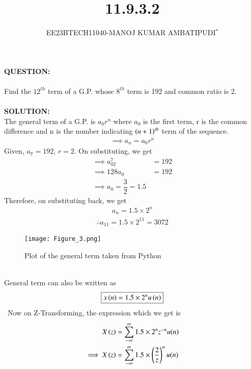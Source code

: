 \documentclass[journal,12pt,twocolumn]{IEEEtran}
\theoremstyle{remark}
\begin{document}

\vspace{3cm}
\title{\textbf{11.9.3.2}}
\author{EE23BTECH11040-MANOJ KUMAR AMBATIPUDI$^{*}$%
}
\maketitle
\newpage
\bigskip
\renewcommand{\thefigure}{\theenumi}
\renewcommand{\thetable}{\theenumi}
\textbf{QUESTION:}\\\\
Find the $12^{th}$ term of a G.P. whose $8^{th}$ term is 192 and common ratio is 2.\\\\
\textbf{SOLUTION:}\\
The general term of a G.P. is $a_0r^{n}$ where $a_0$ is the first term, r is the common difference and n is the number indicating $\left(n+1\right)^{th}$ term of the sequence.
\begin{align}
    \implies a_n=a_0r^{n}
\end{align}
Given, $a_7=192$, $r=2$. On substituting, we get
\begin{align}
\implies a_02^{7}&=192\\
\implies 128a_0&=192\\
\implies\boxed{a_0=\dfrac{3}{2}=1.5}
\end{align}
Therefore, on substituting back, we get
\begin{align}
    a_n=1.5\times2^{n}
\end{align}
\begin{align}
\therefore a_{11} = 1.5\times2^{11} = 3072
\end{align}
\begin{figure}[h]
\renewcommand\thefigure{1} 
    \centering
    \texttt{[image: Figure\_3.png]}
    \caption{Plot of the general term taken from Python}
    \label{fig:1}
\end{figure}\\
General term can also be written as\
\begin{align}
\boxed{x\left(n\right) = 1.5\times2^{n}u\left(n\right)}
\end{align}\
Now on Z-Transforming, the expression which we get is\\
\begin{align}
X\left(z\right) &= \sum_{-\infty}^{\infty}1.5\times2^{n}z^{-n}u(n)   \\
\implies X\left(z\right) &= \sum_{-\infty}^{\infty}1.5\times\left(\dfrac{2}{z}\right)^{n}u(n)
\end{align}
\end{document}
